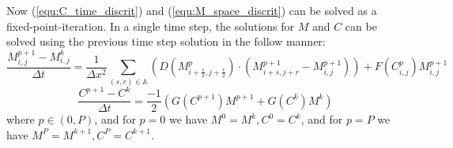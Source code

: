 Now (\ref{equ:C_time_discrit}) and (\ref{equ:M_space_discrit}) can be solved as a fixed-point-iteration.
In a single time step, the solutions for $M$ and $C$ can be solved using the previous time step solution in the follow manner:
\begin{equation} \label{equ:M_fixed_point}
  \frac{M^{p+1}_{i,j} - M^{k}_{i,j}}{\Delta t} = 
    \frac{1}{\Delta x^2} \sum_{(s,r) \in \mathbb{A}} \left( D(M^{p}_{i+\frac{s}{2}, j+\frac{r}{2}}) \cdot
    ( M^{p+1}_{i+s, j+r} - M^{p+1}_{i,j}) \right) + F(C^{p}_{i,j}) M^{p+1}_{i,j}
\end{equation}
\begin{equation} \label{equ:C_fixed_point}
  \frac{C^{p+1} - C^{k}}{\Delta t} = \frac{-1}{2} ( G(C^{p+1}) M^{p+1} + G(C^{k}) M^{k} )
\end{equation}
where $p \in (0,P)$, and for $p = 0$ we have $M^0 = M^{k}, C^0 = C^{k}$, and for $p = P$ we have $M^{P} = M^{k+1}, C^{P} = C^{k+1}$.



